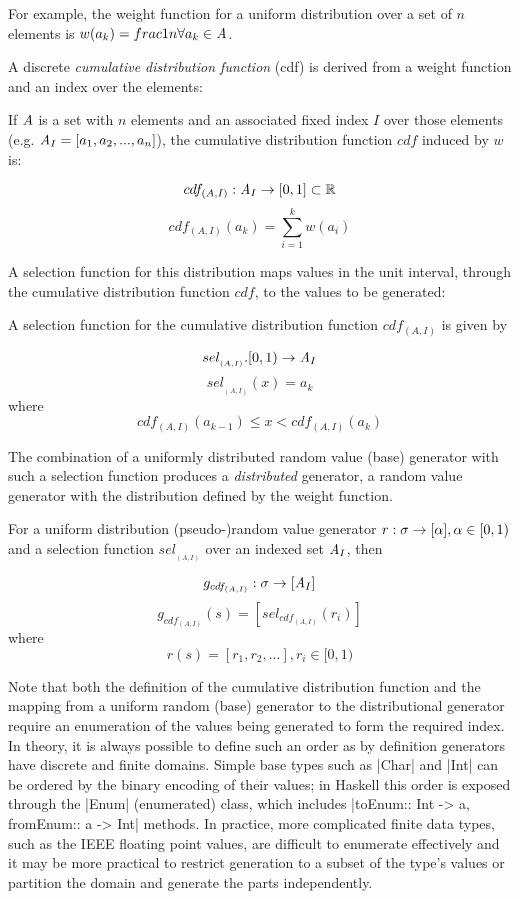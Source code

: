\noindent
For example, the weight function for a uniform distribution over a set of $n$ elements is 
$w(a_k) = frac{1}{n} \forall a_k \in \mathit{A}$.

A discrete \emph{cumulative distribution function} (cdf) is derived from a weight function
and an index over the elements:

\begin{df}
If $\mathit{A}$ is a set with $n$ elements and an associated fixed index $I$ over those elements
(e.g. $\mathit{A}_{I} = [ a_1, a_2, ..., a_n ]$),
the cumulative distribution function $cdf$ induced by $w$ is:

$$cdf_{(A,I)}: \mathit{A}_{I} \rightarrow [0,1] \subset \mathbb{R} $$
$$cdf_{(A,I)} (a_k) =  \sum_{i=1}^{k} w(a_i)  $$
\end{df}

\noindent
A  selection function for this distribution maps values in the unit interval,
through the cumulative distribution function $cdf$, to the values to be generated:

\begin{df}
A selection function for the cumulative distribution function $cdf_{(A,I)}$ is given by

$$ sel_{_{(A,I)}}. [0,1) \rightarrow  \mathit{A}_{I}$$
$$ sel_{_{(A,I)}} (x) = a_k $$
where 
$$ cdf_{(A,I)}(a_{k-1}) \le x <  cdf_{(A,I)}(a_k)$$
\end{df}

\noindent
The combination of a uniformly distributed random value (base) generator
with such a selection function produces a \emph{distributed} generator,
a random value generator with the distribution defined by the weight function.

\begin{df}
For a uniform distribution (pseudo-)random value generator $r: \sigma \rightarrow [ \alpha ], \alpha \in [0,1)$ 
and a selection function  $sel_{_{(A,I)}}$ over an indexed set $\mathit{A}_{I}$,
then

$$ g_{cdf_{(A,I)}} : \sigma \rightarrow [\mathit{A}_{I}] $$
$$ g_{cdf_{(A,I)}} (s) = [ sel_{cdf_{(A,I)}}(r_i) ]$$
where
$$r(s) = [r_1, r_2, ...] , r_i \in [0,1)$$ 
\end{df}

Note that both the definition of the cumulative distribution function
and the mapping from a uniform random (base) generator to the distributional generator
require an enumeration of the values being generated
to form the required index.
In theory, it is always possible to define such an order
as by definition generators have discrete and finite domains.
Simple base types such as |Char| and |Int| can be ordered by 
the binary encoding of their values;
in Haskell this order is exposed through the |Enum|  (enumerated) class, 
which includes |toEnum:: Int -> a, fromEnum:: a -> Int| methods.
In practice, more complicated  finite data types,
such as the IEEE floating point values,
are difficult to enumerate effectively and 
it may be more practical to restrict generation to a subset of the type's values
or partition the domain and generate the parts independently.

